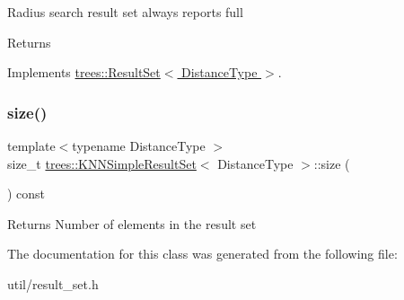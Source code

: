Radius search result set always reports full \begin{DoxyReturn}{Returns}

\end{DoxyReturn}


Implements \hyperlink{classtrees_1_1_result_set}{trees\+::\+Result\+Set$<$ Distance\+Type $>$}.

\mbox{\label{classtrees_1_1_k_n_n_simple_result_set_a293139927910543164fa430ffdf91311}} 
\subsubsection{\texorpdfstring{size()}{size()}}
{\footnotesize\ttfamily template$<$typename Distance\+Type $>$ \\
size\+\_\+t \hyperlink{classtrees_1_1_k_n_n_simple_result_set}{trees\+::\+K\+N\+N\+Simple\+Result\+Set}$<$ Distance\+Type $>$\+::size (\begin{DoxyParamCaption}{ }\end{DoxyParamCaption}) const\hspace{0.3cm}{\ttfamily [inline]}}

\begin{DoxyReturn}{Returns}
Number of elements in the result set 
\end{DoxyReturn}


The documentation for this class was generated from the following file\+:\begin{DoxyCompactItemize}
\item 
util/result\+\_\+set.\+h\end{DoxyCompactItemize}
